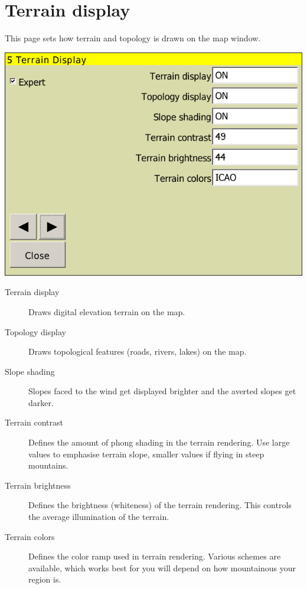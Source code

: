 \documentclass[a4paper,12pt]{refrep}
\begin{document}
\clearpage
\section{Terrain display}\label{sec:terrain-display}

This page sets how terrain and topology is drawn on the map window.

\begin{center}
\includegraphics[angle=0,width=\linewidth,keepaspectratio='true']{figures/config-terrain.png}
\end{center}

\begin{description}
\item[Terrain display]  Draws digital elevation terrain on the map.
\item[Topology display]  Draws topological features (roads, rivers, lakes) on
the map.
\item[Slope shading]  \label{conf:shading} Slopes faced to the wind get
displayed brighter and the averted slopes get darker.
\item[Terrain contrast]  Defines the amount of phong shading in the terrain rendering.  Use large values 
to emphasise terrain slope, smaller values if flying in steep mountains.
\item[Terrain brightness]  Defines the brightness (whiteness) of the terrain rendering.  This controls the 
average illumination of the terrain.
\item[Terrain colors]  Defines the color ramp used in terrain rendering.  Various schemes are available, 
which works best for you will depend on how mountainous your region is.
\end{description}
\end{document}

